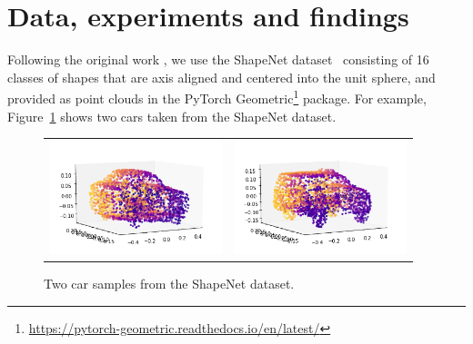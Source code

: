 \documentclass[12pt]{article}
\newcommand{\contentdescription}[1]{}
\begin{document}
    \section{Data, experiments and findings}
    \label{sec:data_experiments_findings}
    \contentdescription{
        Data, experiments and findings (30-40\%):
        Describe the data you are working with for your project.
        What type of data is it?
        Where did it come from?
        How much data are you working with?
        Did you have to do any preprocessing, filtering, or other special treatment to use this data in your project?
        Describe and present the experiments that you performed and what is the reason for those experiments.
        Where applicable define evaluation metrics that you used. Discuss the results that you got.
    }

    Following the original work \cite{pmlr-v80-achlioptas18a}, we use the ShapeNet dataset~\cite{arxiv:1512.03012} consisting of 16 classes of shapes
    that are axis aligned and centered into the unit sphere, and provided as point clouds in the PyTorch Geometric\footnote{\url{https://pytorch-geometric.readthedocs.io/en/latest/}} package.
    For example, Figure~\ref{figure:cars_from_shapenet} shows two cars taken from the ShapeNet dataset.

    \begin{figure}
        \centering
        \begin{tabular}{cc}
            \includegraphics[width = 50mm]{car-shapenet-1} &
            \includegraphics[width = 50mm]{car-shapenet-2} \\
        \end{tabular}
        \caption{Two car samples from the ShapeNet dataset.}
        \label{figure:cars_from_shapenet}
    \end{figure}
\end{document}
